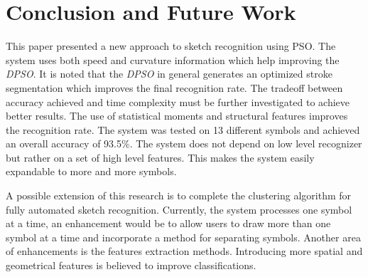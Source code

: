 \documentclass{article}
\begin{document}
\section{Conclusion and Future Work}
\label{ConclusionandFutureWork}
This paper presented a new approach to sketch recognition using PSO. The system uses both speed and curvature information which help improving the \textit{DPSO}. It is noted that the \textit{DPSO} in general generates an optimized stroke segmentation which improves the final recognition rate.  The tradeoff between accuracy achieved and time complexity must be further investigated to achieve better results. The use of statistical moments and structural features improves the recognition rate. The system was tested on 13 different symbols and achieved an overall accuracy of 93.5\%. The system does not depend on low level recognizer but rather on a set of high level features. This makes the system easily expandable to more and more symbols. 

 A possible extension of this research is to complete the clustering algorithm for fully automated sketch recognition. Currently, the system processes one symbol at a time, an enhancement would be to allow users to draw more than one symbol at a time and incorporate a method for separating symbols. Another area of enhancements is the features extraction methods. Introducing more spatial and geometrical features is believed to improve classifications.  


\end{document}
